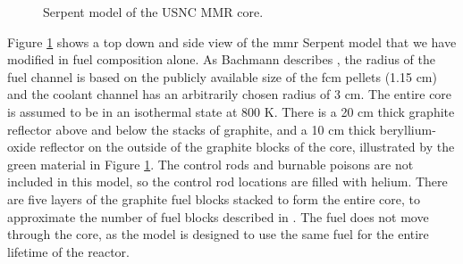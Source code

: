 \begin{figure}[H]
    \hfill
    \caption{Serpent model of the USNC MMR core.}
    \label{fig:mmr_core}
\end{figure}

Figure \ref{fig:mmr_core} shows a top down and side view of the \gls{mmr} Serpent model \cite{bachmann_mmr_like_2023} that we have modified in fuel composition alone. As Bachmann describes \cite{bachmann_thesis_2023}, the radius of the fuel channel is based on the publicly available size of the \gls{fcm} pellets (1.15 cm) and the coolant channel has an arbitrarily chosen radius of 3 cm. The entire core is assumed to be in an isothermal state at 800 K. There is a 20 cm thick graphite reflector above and below the stacks of graphite, and a 10 cm thick beryllium-oxide reflector on the outside of the graphite blocks of the core, illustrated by the green material in Figure \ref{fig:mmr_core}. The control rods and burnable poisons are not included in this model, so the control rod locations are filled with helium. There are five layers of the graphite fuel blocks stacked to form the entire core, to approximate the number of fuel blocks described in \cite{usnc_design_2021}. The fuel does not move through the core, as the model is designed to use the same fuel for the entire lifetime of the reactor.



